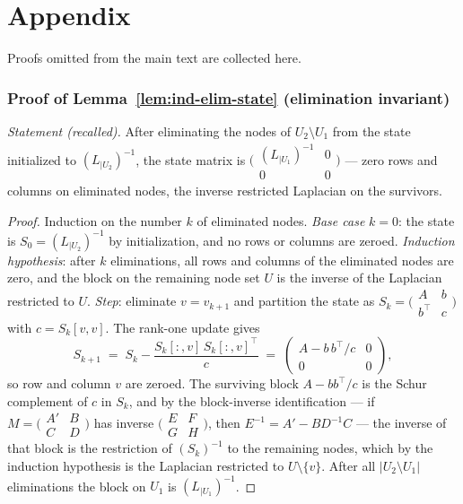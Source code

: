 \section{Appendix}
\label{sec:ind-appendix}

Proofs omitted from the main text are collected here.

\subsubsection*{Proof of Lemma~\ref{lem:ind-elim-state} (elimination invariant)}
{\itshape Statement (recalled).} After eliminating the nodes of
$U_2 \setminus U_1$ from the state initialized to $(L_{|U_2})^{-1}$, the state matrix
is $\bigl(\begin{smallmatrix} (L_{|U_1})^{-1} & 0 \\ 0 & 0 \end{smallmatrix}\bigr)$
--- zero rows and columns on eliminated nodes, the inverse restricted Laplacian on the
survivors.\eop

\begin{proof}
Induction on the number $k$ of eliminated nodes. \emph{Base case} $k = 0$: the state
is $S_0 = (L_{|U_2})^{-1}$ by initialization, and no rows or columns are zeroed.
\emph{Induction hypothesis}: after $k$ eliminations, all rows and columns of the
eliminated nodes are zero, and the block on the remaining node set $U$ is the inverse
of the Laplacian restricted to $U$. \emph{Step}: eliminate $v = v_{k+1}$ and partition
the state as $S_k = \bigl(\begin{smallmatrix} A & b \\ b^{\!\top} & c
\end{smallmatrix}\bigr)$ with $c = S_k[v,v]$. The rank-one update gives
\[
S_{k+1} \;=\; S_k - \frac{S_k[:,v]\,S_k[:,v]^{\!\top}}{c}
\;=\;
\begin{pmatrix} A - b\,b^{\!\top}/c & 0 \\ 0 & 0 \end{pmatrix},
\]
so row and column $v$ are zeroed. The surviving block $A - bb^{\!\top}/c$ is the Schur
complement of $c$ in $S_k$, and by the block-inverse identification --- if
$M = \bigl(\begin{smallmatrix} A' & B \\ C & D \end{smallmatrix}\bigr)$ has inverse
$\bigl(\begin{smallmatrix} E & F \\ G & H \end{smallmatrix}\bigr)$, then
$E^{-1} = A' - BD^{-1}C$ --- the inverse of that block is the restriction of
$(S_k)^{-1}$ to the remaining nodes, which by the induction hypothesis is the Laplacian
restricted to $U \setminus \{v\}$. After all $|U_2 \setminus U_1|$ eliminations the
block on $U_1$ is $(L_{|U_1})^{-1}$.
\end{proof}

